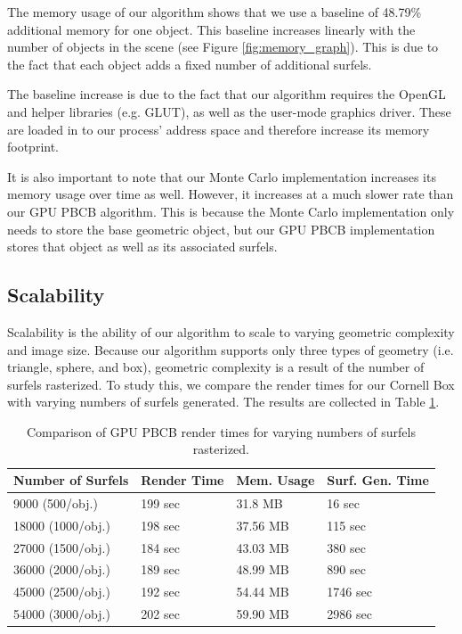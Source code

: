 The memory usage of our algorithm shows that we use a baseline of 48.79\% additional memory for one object. This baseline increases linearly with the number of objects in the scene (see Figure \ref{fig:memory_graph}). This is due to the fact that each object adds a fixed number of additional surfels.

The baseline increase is due to the fact that our algorithm requires the OpenGL and helper libraries (e.g. GLUT), as well as the user-mode graphics driver. These are loaded in to our process' address space and therefore increase its memory footprint.

It is also important to note that our Monte Carlo implementation increases its memory usage over time as well. However, it increases at a much slower rate than our GPU PBCB algorithm. This is because the Monte Carlo implementation only needs to store the base geometric object, but our GPU PBCB implementation stores that object as well as its associated surfels.

\subsection{Scalability}
Scalability is the ability of our algorithm to scale to varying geometric complexity and image size. Because our algorithm supports only three types of geometry (i.e. triangle, sphere, and box), geometric complexity is a result of the number of surfels rasterized. To study this, we compare the render times for our Cornell Box with varying numbers of surfels generated. The results are collected in Table \ref{tbl:geometry_scale}.

\begin{table}[h!]
   \centering
   \begin{tabular}{ | l | l | l | l | }
   \hline
   \textbf{Number of Surfels} & \textbf{Render Time} & \textbf{Mem. Usage} & \textbf{Surf. Gen. Time}\\ \hline
   9000 (500/obj.) & 199 sec & 31.8 MB & 16 sec \\ \hline
   18000 (1000/obj.) & 198 sec & 37.56 MB & 115 sec \\ \hline
   27000 (1500/obj.) & 184 sec & 43.03 MB & 380 sec \\ \hline
   36000 (2000/obj.) & 189 sec & 48.99 MB & 890 sec \\ \hline
   45000 (2500/obj.) & 192 sec & 54.44 MB & 1746 sec \\ \hline
   54000 (3000/obj.) & 202 sec & 59.90 MB & 2986 sec \\ \hline
   \end{tabular}
   \captionfonts
   \caption[Scalability: Geometric Complexity]{Comparison of GPU PBCB render times for varying numbers of surfels rasterized.}
   \label{tbl:geometry_scale}
\end{table}

